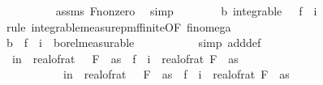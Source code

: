 \begin{isabellebody}
\ \ \ \ \ \ \ \ \isamarkupfalse%
\ assms{\isacharparenleft}{\kern0pt}{}{\isacharparenright}{\kern0pt}\ F{\isacharunderscore}{\kern0pt}{}{\isacharunderscore}{\kern0pt}nonzero\ \isamarkupfalse%
\ simp\isanewline
\ \ \ \ \ \ \isamarkupfalse%
\ b{\isacharunderscore}{\kern0pt}{}{\isacharcolon}{\kern0pt}\ {\isachardoublequoteopen}integrable\ {\isasymOmega}\ {\isacharparenleft}{\kern0pt}{\isasymlambda}{\isasymomega}{\isachardot}{\kern0pt}\ f{}\ {\isasymomega}\ i{\isacharcircum}{\kern0pt}{}{\isacharparenright}{\kern0pt}{\isachardoublequoteclose}\isanewline
\ \ \ \ \ \ \ \ \isamarkupfalse%
\ {\isacharparenleft}{\kern0pt}rule\ integrable{\isacharunderscore}{\kern0pt}measure{\isacharunderscore}{\kern0pt}pmf{\isacharunderscore}{\kern0pt}finite{\isacharbrackleft}{\kern0pt}OF\ fin{\isacharunderscore}{\kern0pt}omega{\isacharunderscore}{\kern0pt}{}{\isacharbrackright}{\kern0pt}{\isacharparenright}{\kern0pt}\isanewline
\ \ \ \ \ \ \isamarkupfalse%
\ b{\isacharunderscore}{\kern0pt}{}{\isacharcolon}{\kern0pt}\ {\isachardoublequoteopen}{\isacharparenleft}{\kern0pt}{\isasymlambda}{\isasymomega}{\isachardot}{\kern0pt}\ f{}\ {\isasymomega}\ i{\isacharparenright}{\kern0pt}\ {\isasymin}\ borel{\isacharunderscore}{\kern0pt}measurable\ {\isasymOmega}\isanewline
\ \ \ \ \ \ \ \ \isamarkupfalse%
\ {\isacharparenleft}{\kern0pt}simp\ add{\isacharcolon}{\kern0pt}{\isasymOmega}def{\isacharparenright}{\kern0pt}\isanewline
\ \ \ \ \ \ \isamarkupfalse%
\ {\isachardoublequoteopen}{\isasymP}{\isacharparenleft}{\kern0pt}{\isasymomega}\ in\ {\isasymOmega}\ real{\isacharunderscore}{\kern0pt}of{\isacharunderscore}{\kern0pt}rat\ {\isacharparenleft}{\kern0pt}{\isasymdelta}\ {\isacharasterisk}{\kern0pt}\ F\ {}\ as{\isacharparenright}{\kern0pt}\ {\isacharless}{\kern0pt}\ {\isasymbar}f{}\ {\isasymomega}\ i\ {\isacharminus}{\kern0pt}\ real{\isacharunderscore}{\kern0pt}of{\isacharunderscore}{\kern0pt}rat\ {\isacharparenleft}{\kern0pt}F\ {}\ as{\isacharparenright}{\kern0pt}{\isasymbar}{\isacharparenright}{\kern0pt}\ {\isasymle}\ \isanewline
\ \ \ \ \ \ \ \ \ \ {\isasymP}{\isacharparenleft}{\kern0pt}{\isasymomega}\ in\ {\isasymOmega}\ real{\isacharunderscore}{\kern0pt}of{\isacharunderscore}{\kern0pt}rat\ {\isacharparenleft}{\kern0pt}{\isasymdelta}\ {\isacharasterisk}{\kern0pt}\ F\ {}\ as{\isacharparenright}{\kern0pt}\ {\isasymle}\ {\isasymbar}f{}\ {\isasymomega}\ i\ {\isacharminus}{\kern0pt}\ real{\isacharunderscore}{\kern0pt}of{\isacharunderscore}{\kern0pt}rat\ {\isacharparenleft}{\kern0pt}F\ {}\ as{\isacharparenright}{\kern0pt}{\isasymbar}{\isacharparenright}{\kern0pt}{\isachardoublequoteclose}\isanewline

\end{isabellebody}
